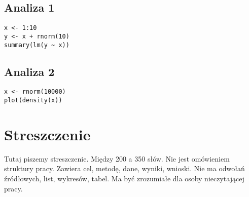 \documentclass[12pt,a4paper,twoside,openany]{book}
\begin{document}
\section*{Analiza 1}
\begin{verbatim}
x <- 1:10
y <- x + rnorm(10)
summary(lm(y ~ x))
\end{verbatim}

\section*{Analiza 2}
\begin{verbatim}
x <- rnorm(10000)
plot(density(x))
\end{verbatim}

\clearpage

\chapter*{Streszczenie}

Tutaj piszemy streszczenie. Między 200 a 350 słów. Nie jest omówieniem struktury pracy. Zawiera cel, metodę, dane, wyniki, wnioski. Nie ma odwołań źródłowych, list, wykresów, tabel. Ma być zrozumiałe dla osoby nieczytającej pracy.
\end{document}
